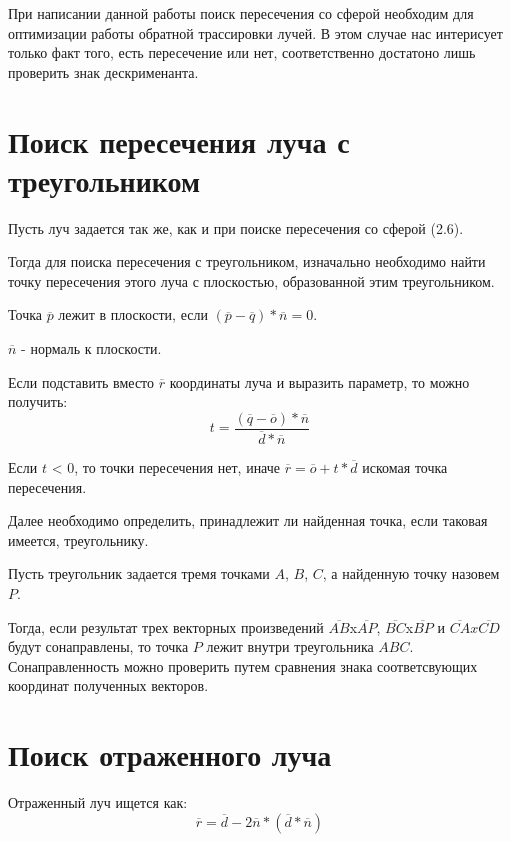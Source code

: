 \documentclass[12pt]{report}
\begin{document}
	При написании данной работы поиск пересечения со сферой необходим для оптимизации работы обратной трассировки лучей. В этом случае нас интерисует только факт того, есть пересечение или нет, соответственно достатоно лишь проверить знак дескрименанта.
	
	\section{Поиск пересечения луча с треугольником}
	
	Пусть луч задается так же, как и при поиске пересечения со сферой (2.6).
	
	Тогда для поиска пересечения с треугольником, изначально необходимо найти точку пересечения этого луча с плоскостью, образованной этим треугольником.
	
	Точка $\overline{p}$ лежит в плоскости, если $(\overline{p} - \overline{q})*\overline{n} = 0$. 
	
	$\overline{n}$ - нормаль к плоскости.
	
	Если подставить вместо $\overline{r}$ координаты луча и выразить параметр, то можно получить:
	\begin{equation}
		t = \frac{(\overline{q} - \overline{o})*\overline{n}}{\overline{d}*\overline{n}}
	\end{equation}
	
	Если $t$ < 0, то точки пересечения нет, иначе $\overline{r} = \overline{o} + t*\overline{d}$ искомая точка пересечения.
	
	Далее необходимо определить, принадлежит ли найденная точка, если таковая имеется, треугольнику.
	
	Пусть треугольник задается тремя точками $A$, $B$, $C$, а найденную точку назовем $P$.
	
	Тогда, если результат трех векторных произведений $\overline{AB}$x$\overline{AP}$, $\overline{BC}$x$\overline{BP}$ и $\overline{CA}x\overline{CD}$ будут сонаправлены, то точка $P$ лежит внутри треугольника $ABC$. Сонаправленность можно проверить путем сравнения знака соответсвующих координат полученных векторов.
	
	\section{Поиск отраженного луча}

	Отраженный луч ищется как:
	\begin{equation}
		\overline{r} = \overline{d} - 2\overline{n}*(\overline{d}*\overline{n})
	\end{equation}
	
\end{document}
